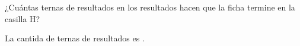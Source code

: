 ¿Cuántas ternas de resultados en los resultados hacen que la ficha termine en la casilla H?

La cantida de ternas de resultados es \fillin[2].